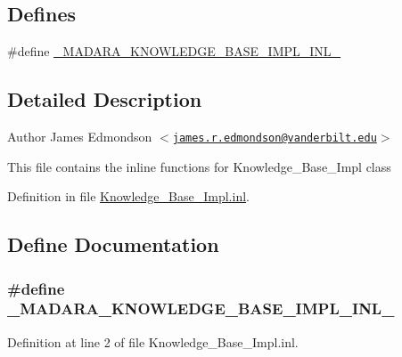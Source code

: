 \subsection*{Defines}
\begin{DoxyCompactItemize}
\item 
\#define \hyperlink{Knowledge__Base__Impl_8inl_ac60beba37ce65c31a135092aee7c4229}{\_\-MADARA\_\-KNOWLEDGE\_\-BASE\_\-IMPL\_\-INL\_\-}
\end{DoxyCompactItemize}


\subsection{Detailed Description}
\begin{DoxyAuthor}{Author}
James Edmondson $<$\href{mailto:james.r.edmondson@vanderbilt.edu}{\tt james.r.edmondson@vanderbilt.edu}$>$
\end{DoxyAuthor}
This file contains the inline functions for Knowledge\_\-Base\_\-Impl class 

Definition in file \hyperlink{Knowledge__Base__Impl_8inl_source}{Knowledge\_\-Base\_\-Impl.inl}.



\subsection{Define Documentation}
\hypertarget{Knowledge__Base__Impl_8inl_ac60beba37ce65c31a135092aee7c4229}{
\subsubsection[{\_\-MADARA\_\-KNOWLEDGE\_\-BASE\_\-IMPL\_\-INL\_\-}]{\setlength{\rightskip}{0pt plus 5cm}\#define \_\-MADARA\_\-KNOWLEDGE\_\-BASE\_\-IMPL\_\-INL\_\-}}
\label{da/d3c/Knowledge__Base__Impl_8inl_ac60beba37ce65c31a135092aee7c4229}


Definition at line 2 of file Knowledge\_\-Base\_\-Impl.inl.

